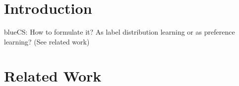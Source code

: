 \documentclass[11pt,a4paper]{article}
\title{}
\author{
 Template Affiliation/Address Line 1 \\
 Template Affiliation/Address Line 2 \\
 Template Affiliation/Address Line 2 \\
  {\sf template.email@sampledomain.com} \\
}
\date{}
\newcommand{\cs}[1]{\begin{color}{blue}CS: #1\end{color}\xspace}
\begin{document}
\maketitle
\begin{abstract}

\begin{itemize}
	\item We address the task of human object naming: given an object that is depicted in an image, produce the name for it. 
	\item While people, when being asked to name an object, tend to agree on a specific name in many cases, there is also variation (REF). The choice of a name for an individual object can thus be considered to underlie some probability distribution over possible names, representing naming preferences. 
	\cs{How could we examine in how far/under which conditions the difference in rankings between two objects is not by chance? randomised test?}
	\item Variation can be effected by several factors, such as the appearance of the object itself, or its situated context (both have been studied in psychological research, REF). 
	\item Our goal is to understand the factors which play a role in preferring one name over valid name alternatives for individual objects. 
	\item We formulate the task of object naming as the prediction of  object name preferences, and present XXX model. 
	\item We examine the factors: 
	\item Our results show that XXX.
	
\end{itemize}
 
\end{abstract}

\section{Introduction}
\label{sec:introduction}

\cs{How to formulate it? As label distribution learning or as preference learning? (See related work)}

\section{Related Work}
\label{sec:related}
\end{document}
